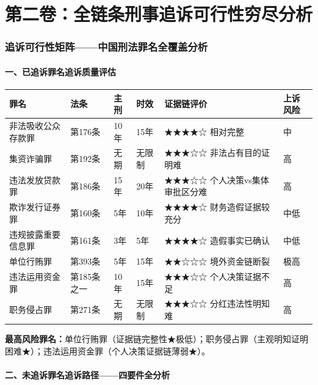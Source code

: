 \documentclass[11pt,a4paper,oneside,openany]{article}
\begin{document}
\newpage
\part{第二卷：全链条刑事追诉可行性穷尽分析}

\section{追诉可行性矩阵——中国刑法罪名全覆盖分析}
\subsection{一、已追诉罪名追诉质量评估}
\begin{threeparttable}
\caption{已追诉8项罪名追诉质量评估}
\begin{tabular}{p{2.3cm}p{1.3cm}p{1.3cm}p{1.8cm}p{4.2cm}p{1.3cm}}
\toprule
\textbf{罪名} & \textbf{法条} & \textbf{主刑} & \textbf{时效} & \textbf{证据链评价} & \textbf{上诉风险} \\
\midrule
非法吸收公众存款罪 & 第176条 & 10年 & 15年 & ★★★★☆ 相对完整 & 中 \\
集资诈骗罪 & 第192条 & 无期 & 无限制 & ★★★☆☆ 非法占有目的证明难 & 高 \\
违法发放贷款罪 & 第186条 & 15年 & 20年 & ★★★☆☆ 个人决策vs集体审批区分难 & 高 \\
欺诈发行证券罪 & 第160条 & 5年 & 10年 & ★★★★☆ 财务造假证据较充分 & 中低 \\
违规披露重要信息罪 & 第161条 & 3年 & 5年 & ★★★★☆ 造假事实已确认 & 中低 \\
单位行贿罪 & 第393条 & 5年 & 15年 & ★★☆☆☆ 境外资金链断裂 & 极高 \\
违法运用资金罪 & 第185条之一 & 10年 & 15年 & ★★★☆☆ 个人决策证据不足 & 高 \\
职务侵占罪 & 第271条 & 无期 & 无限制 & ★★★☆☆ 分红违法性明知难 & 高 \\
\bottomrule
\end{tabular}
\end{threeparttable}

\textbf{最高风险罪名：}单位行贿罪（证据链完整性★极低）；职务侵占罪（主观明知证明困难★）；违法运用资金罪（个人决策证据链薄弱★）。

\subsection{二、未追诉罪名追诉路径——四要件全分析}
\end{document}
